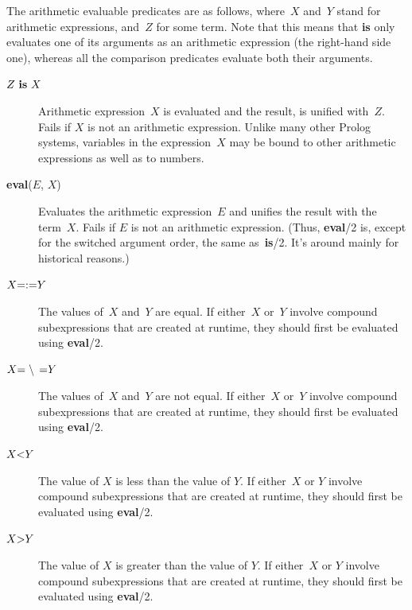 The arithmetic evaluable predicates are as follows,
where~$X$ and~$Y$ stand for arithmetic expressions, and~$Z$ for some term.
Note that this means that {\bf is} only evaluates one of its arguments
as an arithmetic expression (the right-hand side one),
whereas all the comparison
predicates evaluate both their arguments.

\begin{description}
\item[$Z~{\bf is}~X$] 
    Arithmetic expression~$X$ is evaluated and the result, is unified with~$Z$.
    Fails if $X$ is not an arithmetic expression.
    Unlike many other Prolog systems, variables in the expression~$X$ may be
    bound to other arithmetic expressions as well as to numbers.

\item[{\bf eval}($E$, $X$)] 
    Evaluates the arithmetic expression~$E$ and unifies the result
    with the term~$X$.
    Fails if $E$ is not an arithmetic expression.
    (Thus, {\bf eval}/2 is, except for the switched argument order, the
    same as~{\bf is}/2.
    It's around mainly for historical reasons.)

\item[$X {\bf =:=} Y$] 
    The values of~$X$ and~$Y$ are equal.
    If either~$X$ or~$Y$ involve compound subexpressions
    that are created at runtime,
    they should first be evaluated using {\bf eval}/2.

\item[$X {\bf =\backslash\,=} Y$]
    The values of~$X$ and~$Y$ are not equal.
    If either~$X$ or~$Y$
    involve compound subexpressions that are created at runtime,
    they should first be evaluated using {\bf eval}/2.

\item[$X {\bf <} Y$] 
    The value of $X$ is less than the value of $Y$.
    If either~$X$ or $Y$
    involve compound subexpressions that are created at runtime,
    they should first be evaluated using {\bf eval}/2.

\item[$X {\bf >} Y$] 
    The value of $X$ is greater than the value of $Y$.
    If either~$X$ or $Y$ involve compound subexpressions that are created
    at runtime, they should first be evaluated using {\bf eval}/2.


\end{description}
